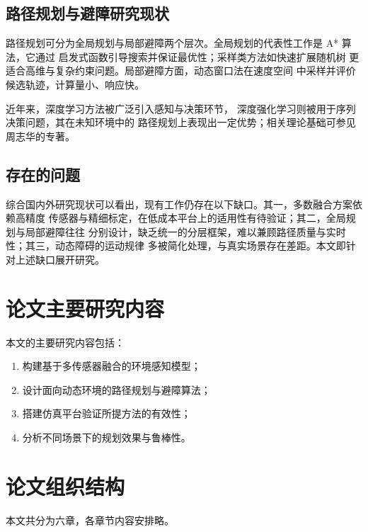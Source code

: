 \subsection{路径规划与避障研究现状}

路径规划可分为全局规划与局部避障两个层次。全局规划的代表性工作是 A* 算法，它通过
启发式函数引导搜索并保证最优性\cite{hart1968formal}；采样类方法如快速扩展随机树
更适合高维与复杂约束问题\cite{lavalle1998rrt}。局部避障方面，动态窗口法在速度空间
中采样并评价候选轨迹，计算量小、响应快\cite{fox1997dw}。

近年来，深度学习方法被广泛引入感知与决策环节\cite{lecun2015deep,he2016deep}，
深度强化学习则被用于序列决策问题\cite{mnih2015human,silver2016go}，其在未知环境中的
路径规划上表现出一定优势；相关理论基础可参见周志华的专著\cite{zhou2016ml}。

\subsection{存在的问题}

综合国内外研究现状可以看出，现有工作仍存在以下缺口。其一，多数融合方案依赖高精度
传感器与精细标定，在低成本平台上的适用性有待验证；其二，全局规划与局部避障往往
分别设计，缺乏统一的分层框架，难以兼顾路径质量与实时性；其三，动态障碍的运动规律
多被简化处理，与真实场景存在差距。本文即针对上述缺口展开研究。

\section{论文主要研究内容}
本文的主要研究内容包括：
\begin{enumerate}
  \item 构建基于多传感器融合的环境感知模型；
  \item 设计面向动态环境的路径规划与避障算法；
  \item 搭建仿真平台验证所提方法的有效性；
  \item 分析不同场景下的规划效果与鲁棒性。
\end{enumerate}

\section{论文组织结构}
本文共分为六章，各章节内容安排略。